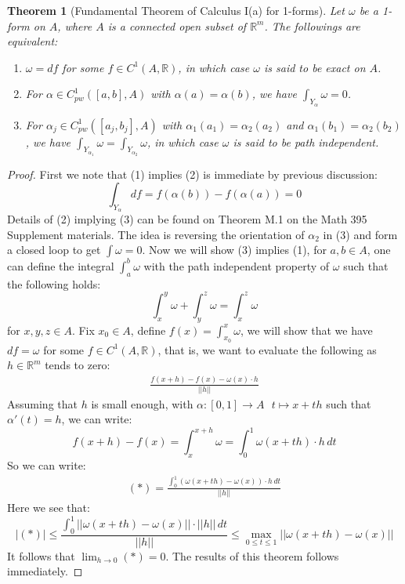 \documentclass[11pt,oneside]{book}
\theoremstyle{break}
\theoremstyle{break}
\newtheorem{thm}{Theorem}[section]
\newcommand{\R}{\mathbb{R}}
\begin{document}
\begin{thm}[Fundamental Theorem of Calculus I(a) for 1-forms]
Let $\omega$ be a 1-form on $A$, where $A$ is a connected open subset of $\R^m$. The followings are equivalent:
\begin{enumerate}[topsep=3pt,itemsep=-1ex,partopsep=1ex,parsep=1ex]
\item $\omega = df$ for some $f \in C^1(A,\R)$, in which case $\omega$ is said to be exact on $A$.
\item For $\alpha \in C_{pw}^1 ([a,b],A)$ with $\alpha(a) = \alpha(b)$, we have $\int_{Y_\alpha} \omega = 0$.
\item For $\alpha_j \in C_{pw}^1 ([a_j,b_j],A)$ with $\alpha_1(a_1) = \alpha_2(a_2)$ and $\alpha_1(b_1) = \alpha_2(b_2)$, we have $\int_{Y_{\alpha_1}}\omega = \int_{Y_{\alpha_2}} \omega $, in which case $\omega$ is said to be path independent. 
\end{enumerate}
\end{thm}
\begin{proof}
First we note that (1) implies (2) is immediate by previous discussion: 
$$\int_{Y_\alpha} df = f(\alpha(b))-f(\alpha(a)) = 0$$
Details of (2) implying (3) can be found on Theorem M.1 on the Math 395 Supplement materials. The idea is reversing the orientation of $\alpha_2$ in (3) and form a closed loop to get $\int \omega = 0$. Now we will show (3) implies (1), for $a,b \in A$, one can define the integral $\int_a^b \omega$ with the path independent property of $\omega$ such that the following holds:
$$\int_x^y \omega + \int_y^z \omega = \int_x^z \omega$$
for $x,y,z \in A$. Fix $x_0 \in A$, define $f(x) = \int_{x_0}^ x \omega$, we will show that we have $df = \omega$ for some $f \in C^1(A,\R)$, that is, we want to evaluate the following as $h\in \R^m$ tends to zero:
\begin{align*}
\frac{f(x+h)-f(x) -\omega(x)\cdot h}{||h||} \tag{*}
\end{align*}
Assuming that $h$ is small enough, with $\alpha:[0,1]\to A\ \ \ t\mapsto x+th$ such that $\alpha'(t) = h$, we can write:
$$f(x+h)-f(x) = \int_x^{x+h}\omega = \int_0^1 \omega (x+th) \cdot h\, dt $$
So we can write:
\begin{align*}
(*) = \frac{\int_0^1 \left(\omega(x+th) - \omega(x)\right)\cdot h \, dt}{||h||}
\end{align*}
Here we see that:
$$|(*)|\leq \frac{\int_0^1||\omega(x+th)-\omega(x)||\cdot ||h||\, dt}{||h||} \leq \max_{0\leq t\leq 1} ||\omega(x+th)-\omega(x)||$$
It follows that $\lim_{h\to 0}(*) = 0$. The results of this theorem follows immediately.
\end{proof}
\end{document}
